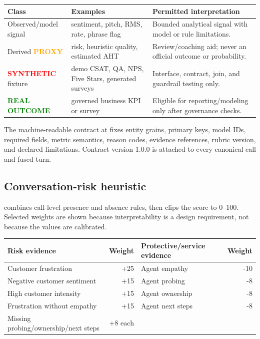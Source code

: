 \documentclass[11pt,letterpaper]{article}
\newcommand{\proxy}{\textcolor{orange}{\textbf{PROXY}}}
\newcommand{\synthetic}{\textcolor{red}{\textbf{SYNTHETIC}}}
\newcommand{\realoutcome}{\textcolor{green}{\textbf{REAL OUTCOME}}}
\begin{document}
\begin{center}\small
\begin{tabular}{p{}p{}p{}}
\toprule
Class & Examples & Permitted interpretation \\
\midrule
Observed/model signal & sentiment, pitch, RMS, rate, phrase flag & Bounded analytical
signal with model or rule limitations. \\
Derived \proxy & risk, heuristic quality, estimated AHT & Review/coaching aid; never an
official outcome or probability. \\
\synthetic{} fixture & demo CSAT, QA, NPS, Five Stars, generated surveys & Interface,
contract, join, and guardrail testing only. \\
\realoutcome{} & governed business KPI or survey & Eligible for reporting/modeling only
after governance checks. \\
\bottomrule
\end{tabular}
\end{center}

The machine-readable contract at  fixes entity
grains, primary keys, model IDs, required fields, metric semantics, reason codes,
evidence references, rubric version, and declared limitations. Contract version 1.0.0
is attached to every canonical call and fused turn.

\subsection{Conversation-risk heuristic}

 combines call-level presence and absence rules, then clips
the score to 0--100. Selected weights are shown because interpretability is a design
requirement, not because the values are calibrated.

\begin{center}\small
\begin{tabular}{p{}rp{}r}
\toprule
Risk evidence & Weight & Protective/service evidence & Weight \\
\midrule
Customer frustration & +25 & Agent empathy & -10 \\
Negative customer sentiment & +15 & Agent probing & -8 \\
High customer intensity & +15 & Agent ownership & -8 \\
Frustration without empathy & +15 & Agent next steps & -8 \\
Missing probing/ownership/next steps & +8 each & & \\
\bottomrule
\end{tabular}
\end{center}
\end{document}
